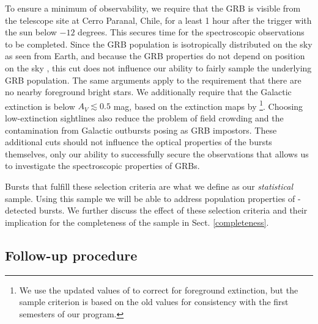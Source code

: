 \documentclass{aa}    %
\begin{document}
To ensure a minimum of observability, we require that the GRB is visible from
the telescope site at Cerro Paranal, Chile, for a least 1 hour after the trigger
with the sun below $-12$ degrees. This secures time for the spectroscopic
observations to be completed. Since the GRB population is isotropically
distributed on the sky as seen from Earth, and because the GRB properties do not
depend on position on the sky \citep{Meegan1992, Briggs1996, Ukwatta2016}, this
cut does not influence our ability to fairly sample the underlying GRB
population. The same arguments apply to the requirement that there are no nearby
foreground bright stars. We additionally require that the Galactic extinction is
below $A_V \lesssim 0.5$ mag, based on the extinction maps by
\citet{Schlegel1998}\footnote{We use the updated values of \citet{Schlafly2011}
	to correct for foreground extinction, but the sample criterion is based on the
	old \citet{Schlegel1998} values for consistency with the first semesters of our
	program.}. Choosing low-extinction sightlines also reduce the problem of field
crowding and the contamination from Galactic outbursts posing as GRB impostors.
These additional cuts should not influence the optical properties of the bursts
themselves, only our ability to successfully secure the observations that allows
us to investigate the spectroscopic properties of GRBs.

Bursts that fulfill these selection criteria are what we define as our
\textit{statistical} sample. Using this sample we will be able to address
population properties of \swift-detected bursts. We further discuss the effect
of these selection criteria and their implication for the completeness of the
sample in Sect. \ref{completeness}.

\subsection{Follow-up procedure}
\end{document}
